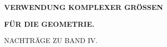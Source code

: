 \clearpage{}
\thispagestyle{empty}
\vspace*{4cm}
\begin{center}
\textbf{\Large VERWENDUNG KOMPLEXER GRÖSSEN}\par\bigskip
\textbf{\Large FÜR DIE GEOMETRIE.}\par\bigskip
NACHTRÄGE ZU BAND IV.
\end{center}
\clearpage
